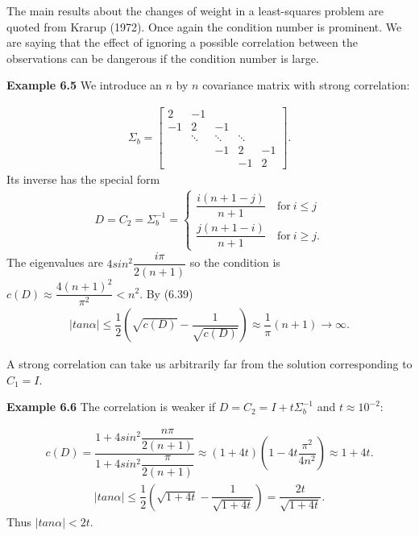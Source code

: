 The main results about the changes of weight in a least-squares problem are quoted from Krarup (1972). Once again the condition number is prominent. We are saying that the effect of ignoring a possible correlation between the observations can be dangerous if the condition number is large.
\begin{flushleft}
	\textbf{Example 6.5} We introduce an $n$ by $ n$ covariance matrix with strong correlation:
\end{flushleft}
\begin{align*}
\Sigma_{b} =
\begin{bmatrix}
2    &    -1          &        &        & \\
-1   &     2    &    -1        &        & \\
&       \ddots  &  \ddots      & \ddots & \\
&          &         -1    &   2    &  -1 \\
&          &          &       -1    &   2
\end{bmatrix}.
\end{align*}
Its inverse has the special form
\begin{align*}
D = C_{2} = \Sigma^{-1}_{b} =
\left\{
\begin{aligned}
\dfrac{i(n+1-j)}{n+1} \quad \text{for} \ i\leq j\\
\dfrac{j(n+1-i)}{n+1} \quad \text{for} \ i\geq j.
\end{aligned}
\right.
\end{align*}
The eigenvalues are $ 4sin^{2} \dfrac{i\pi}{2(n+1)}$ so the condition is $ c(D) \approx \dfrac{4(n+1)^{2}}{\pi^{2}} < n^{2} $. By (6.39)
\begin{align*}
 \lvert tan \alpha \rvert \leq \dfrac{1}{2} ( \sqrt{c(D)} - \dfrac{1}{\sqrt{c(D)}}) \approx \dfrac{1}{\pi} (n+1) \rightarrow \infty.
\end{align*}
\begin{flushleft}
	A strong correlation can take us arbitrarily far from the solution corresponding to $C_{1}=I$.
\end{flushleft}
\begin{flushleft}
	\textbf{Example 6.6} The correlation is weaker if $ D = C_{2} = I +t\Sigma^{-1}_{b}$ and $ t \approx 10^{-2}$:
\end{flushleft}
\begin{align*}
c(D) = \dfrac{1+4sin^{2}\dfrac{n\pi}{2(n+1)}}{1+4sin^{2}\dfrac{\pi}{2(n+1)}} \approx 
(1+4t)(1-4t\dfrac{\pi^{2}}{4n^{2}}) \approx 1+4t.
\end{align*}
\begin{align*}
\lvert tan \alpha \rvert \leq \dfrac{1}{2} (\sqrt{1+4t} - \dfrac{1}{\sqrt{1+4t}}) = \dfrac{2t}{\sqrt{1+4t}}.
\end{align*}
Thus $\lvert tan \alpha \rvert < 2t $.
